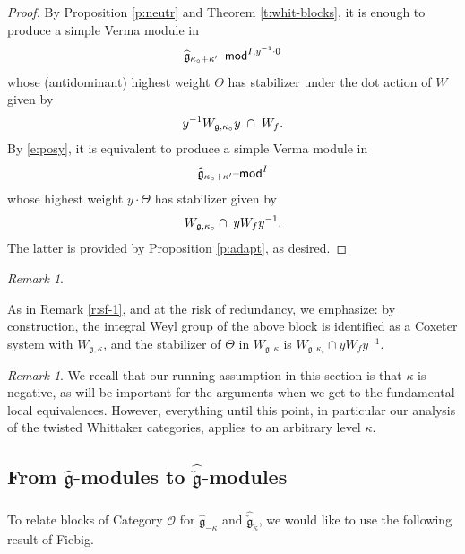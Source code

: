 \documentclass[11pt,reqno]{amsart}
\newcommand{\cgk}{\widehat{\check{\mathfrak{g}}}_{\check{\kappa}}}
\newcommand{\fg}{\mathfrak{g}}
\theoremstyle{remark}
\newtheorem{re}[subsubsection]{Remark}
\numberwithin{equation}{section}
\newcommand{\gmk}{\widehat{\fg}_{-\kappa}}
\renewcommand{\mod}{\text{\textendash}\mathsf{mod}}
\begin{document}
\begin{proof} By Proposition \ref{p:neutr} and Theorem \ref{t:whit-blocks}, it 
is 	enough to produce a simple Verma module in 
	\[\widehat{\fg}_{\kappa_{\circ} + 
		\kappa'}\mod^{I, y^{-1} \cdot 0}\]
	whose (antidominant) highest weight $\Theta$ has stabilizer under the dot 
	action of $W$ 
	given 
	by 
	\[y^{-1} W_{\fg, \kappa_{\circ}} y \hspace{1mm} \cap \hspace{1mm} W_f.	\]
	By \eqref{e:posy}, it is equivalent to produce a simple Verma module 
	in 
	\[\widehat{\fg}_{\kappa_{\circ} + 
		\kappa'}\mod^{I} \]
	whose highest weight $y \cdot \Theta$ has stabilizer given by 
	\begin{equation} \label{e:stab} W_{\fg, \kappa_{\circ}} \cap \hspace{1mm} 
	yW_fy^{-1}. \end{equation}
	The latter is provided by Proposition \ref{p:adapt}, as desired. 
\end{proof}



\begin{re}\label{r:sf-2}

As in Remark \ref{r:sf-1}, and at the risk of 
redundancy, we emphasize: 
by construction, the integral Weyl group of the above block
is identified as a Coxeter system with $W_{\fg,\kappa}$, and the stabilizer of 
$\Theta$ in 
$W_{\fg,\kappa}$ is 
$W_{\fg, \kappa_{\circ}}  \cap yW_fy^{-1}$.

\end{re}


\begin{re} We recall that our running assumption in this section is that 
$\kappa$ is negative, as will be important for the arguments when we get to the 
fundamental local equivalences. However,  everything until this point, in 
particular our analysis of the twisted Whittaker categories, applies 
to an arbitrary level $\kappa$. 
\end{re}



\subsection{From $\widehat{\fg}$-modules to $\widehat{\check{\fg}}$-modules}


\subsubsection{}
To relate blocks of Category $\mathscr{O}$ for $\gmk$ and $\cgk$, we would like 
to use the following result of Fiebig.
\end{document}
